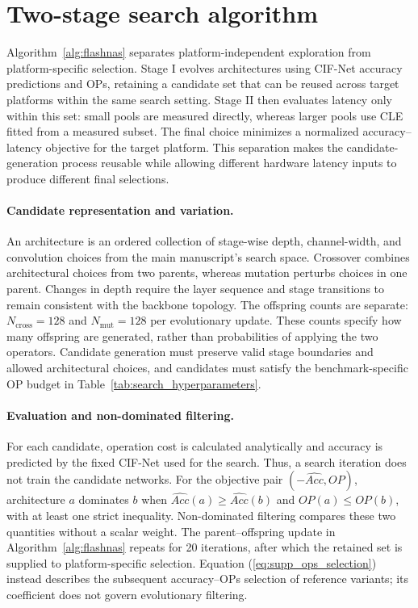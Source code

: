 \documentclass[preprint,review,12p,times]{elsarticle}
\begin{document}
\section{Two-stage search algorithm}
\label{sec:supp_search_algorithm}

Algorithm~\ref{alg:flashnas} separates platform-independent exploration from platform-specific selection. Stage I evolves architectures using CIF-Net accuracy predictions and OPs, retaining a candidate set that can be reused across target platforms within the same search setting. Stage II then evaluates latency only within this set: small pools are measured directly, whereas larger pools use CLE fitted from a measured subset. The final choice minimizes a normalized accuracy--latency objective for the target platform. This separation makes the candidate-generation process reusable while allowing different hardware latency inputs to produce different final selections.

\begingroup
\color{red}
\paragraph{Candidate representation and variation.}
An architecture is an ordered collection of stage-wise depth, channel-width, and convolution choices from the main manuscript's search space. Crossover combines architectural choices from two parents, whereas mutation perturbs choices in one parent. Changes in depth require the layer sequence and stage transitions to remain consistent with the backbone topology. The offspring counts are separate: $N_{\text{cross}}=128$ and $N_{\text{mut}}=128$ per evolutionary update. These counts specify how many offspring are generated, rather than probabilities of applying the two operators. Candidate generation must preserve valid stage boundaries and allowed architectural choices, and candidates must satisfy the benchmark-specific OP budget in Table~\ref{tab:search_hyperparameters}.

\paragraph{Evaluation and non-dominated filtering.}
For each candidate, operation cost is calculated analytically and accuracy is predicted by the fixed CIF-Net used for the search. Thus, a search iteration does not train the candidate networks. For the objective pair $(-\widehat{Acc},OP)$, architecture $a$ dominates $b$ when $\widehat{Acc}(a)\geq\widehat{Acc}(b)$ and $OP(a)\leq OP(b)$, with at least one strict inequality. Non-dominated filtering compares these two quantities without a scalar weight. The parent--offspring update in Algorithm~\ref{alg:flashnas} repeats for 20 iterations, after which the retained set is supplied to platform-specific selection. Equation (\ref{eq:supp_ops_selection}) instead describes the subsequent accuracy--OPs selection of reference variants; its coefficient does not govern evolutionary filtering.
\end{document}
